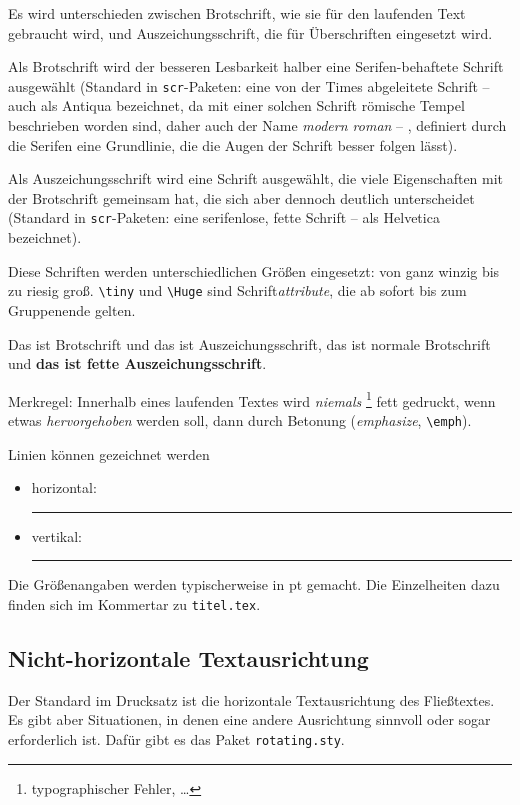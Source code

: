 \documentclass[ngerman,               %
               a4paper,               %
               fleqn,                 %
                     ]{scrartcl}       %
\begin{document}
Es wird unterschieden zwischen Brotschrift, wie sie für den laufenden Text
gebraucht wird, und Auszeichungsschrift, die für Überschriften eingesetzt
wird.

Als Brotschrift wird der besseren Lesbarkeit halber eine Serifen-behaftete
Schrift ausgewählt (Standard in \texttt{scr}-Paketen: eine von der Times
abgeleitete Schrift -- auch als Antiqua bezeichnet, da mit einer solchen
Schrift römische Tempel beschrieben worden sind, daher auch der Name
\textit{modern roman} -- , definiert durch die Serifen eine Grundlinie, die
die Augen der Schrift besser folgen lässt).

Als Auszeichungsschrift wird eine Schrift ausgewählt, die viele
Eigenschaften mit der Brotschrift gemeinsam hat, die sich aber dennoch
deutlich unterscheidet (Standard in \texttt{scr}-Paketen: eine serifenlose,
fette Schrift -- als Helvetica bezeichnet).

Diese Schriften werden unterschiedlichen Größen eingesetzt: von {\tiny ganz
  winzig} bis zu {\Huge riesig groß}. \lstinline|\tiny|
und \lstinline|\Huge| sind Schrift\emph{attribute}, die ab sofort bis zum
Gruppenende gelten.

\textnormal{Das ist Brotschrift} und \textsf{das ist Auszeichungsschrift},
\textnormal{das ist normale Brotschrift} und \textsf{\bfseries das ist
  fette Auszeichungsschrift}.

Merkregel: Innerhalb eines laufenden Textes wird \emph{niemals}%
\footnote{typographischer Fehler, \ldots} fett gedruckt, wenn etwas
\emph{hervorgehoben} werden soll, dann durch Betonung
(\textit{emphasize}, \lstinline|\emph|).

Linien können gezeichnet werden
\begin{itemize}
  \item horizontal: \rule{220pt}{2pt}
  \item vertikal: \rule{1pt}{22pt}
\end{itemize}
Die Größenangaben werden typischerweise in pt gemacht. Die Einzelheiten dazu
finden sich im Kommertar zu \texttt{titel.tex}.


\subsection{Nicht-horizontale Textausrichtung}

Der Standard im Drucksatz ist die horizontale Textausrichtung des Fließtextes.
Es gibt aber Situationen, in denen eine andere Ausrichtung sinnvoll oder sogar
erforderlich ist. Dafür gibt es das Paket \texttt{rotating.sty}.
\end{document}
